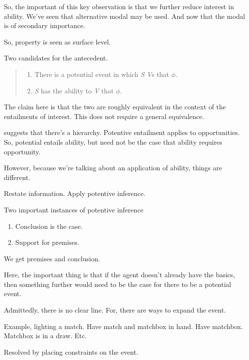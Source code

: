 \begin{note}
  So, the important of this key observation is that we further reduce interest in ability.
  We've seen that alternative modal may be used.
  And now that the modal is of secondary importance.

  So, property is seen as surface level.

  Two candidates for the antecedent.
\begin{quote}
  \begin{enumerate}
  \item There is a potential event in which \emph{S} \emph{V}s that \(\phi\).
  \item \emph{S} has the ability to \emph{V} that \(\phi\).
  \end{enumerate}
  \end{quote}
\end{note}

\begin{note}
  The claim here is that the two are roughly equivalent in the context of the entailments of interest.
  This does not require a general equivalence.

  \textcite{Werner:2011tp} suggests that there's a hierarchy.
  Potentive entailment applies to opportunities.
  So, potential entails ability, but need not be the case that ability requires opportunity.

  However, because we're talking about an application of ability, things are different.
\end{note}


\begin{note}
  Restate information.
  Apply potentive inference.

  Two important instances of potentive inference
  \begin{enumerate}
  \item Conclusion is the case.
  \item Support for premises.
  \end{enumerate}
\end{note}

\begin{note}
  We get premises and conclusion.

  Here, the important thing is that if the agent doesn't already have the basics, then something further would need to be the case for there to be a potential event.

  Admittedly, there is no clear line.
  For, there are ways to expand the event.

  Example, lighting a match.
  Have match and matchbox in hand.
  Have matchbox.
  Matchbox is in a draw.
  Etc.

  Resolved by placing constraints on the event.
\end{note}

